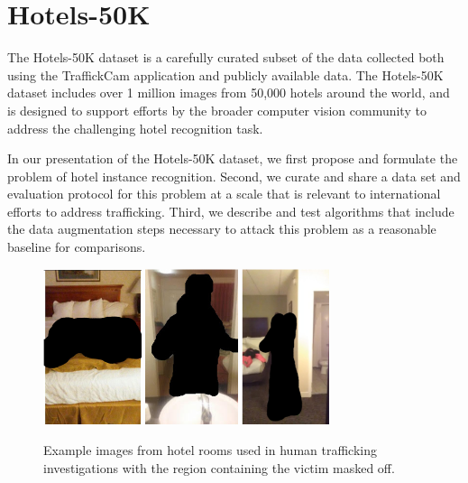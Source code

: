 
\chapter{Hotels-50K}
\label{ch:4}

The Hotels-50K dataset is a carefully curated subset of the data collected both using the TraffickCam application and publicly available data. The Hotels-50K dataset includes over 1 million images from 50,000 hotels around the world, and is designed to support efforts by the broader computer vision community to address the challenging hotel recognition task.

In our presentation of the Hotels-50K dataset, we first propose and formulate the problem of hotel instance recognition.  Second, we curate and share a data set and evaluation protocol for this problem at a scale that is relevant to international efforts to address trafficking.  Third, we describe and test algorithms that include the data augmentation steps necessary to attack this problem as a reasonable baseline for comparisons.

\begin{figure}
    \centering
    \includegraphics[height=1.8in]{figures/chapter4/example_images/queries/1.png}
    \includegraphics[height=1.8in]{figures/chapter4/example_images/queries/2.png}
    \includegraphics[height=1.8in]{figures/chapter4/example_images/queries/3.png}
    \caption{Example images from hotel rooms used in human trafficking investigations with the region containing the victim masked off.}
    \label{fig:queries}
\end{figure}


